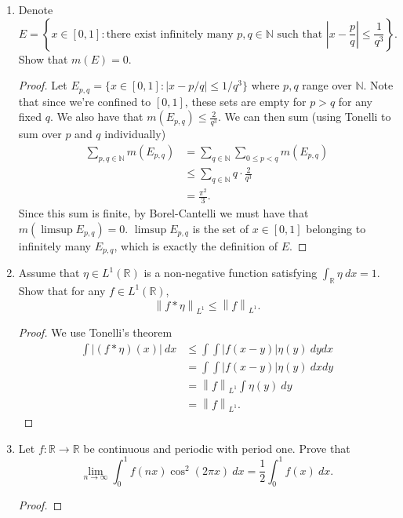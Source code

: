 \documentclass[11pt,letterpaper]{report}
\newcommand{\naturals}{\mathbb{N}}
\newcommand{\reals}{\mathbb{R}}
\newcommand{\Lp}[2]{\left\|{#1}\right\|_{L^{#2}}}
\begin{document}
\begin{enumerate}
	\item Denote
	\[
	E = \left\{x\in [0,1]: \text{there exist infinitely many $p, q\in \naturals$ such that }|x-\frac{p}{q}| \leq \frac{1}{q^3}\right\}.
	\]
	Show that $m(E) = 0$.
	\begin{proof}
		Let $E_{p,q} = \{x\in [0,1]: |x-p/q|\leq 1/q^3\}$ where $p,q$ range over $\naturals$. Note that since we're confined to $[0,1]$, these sets are empty for $p>q$ for any fixed $q$. We also have that $m(E_{p,q}) \leq \frac{2}{q^3}$. We can then sum (using Tonelli to sum over $p$ and $q$ individually)
		\begin{align*}
			\sum_{p,q\in \naturals}m(E_{p,q}) &= \sum_{q\in \naturals}\sum_{0\leq p< q}m(E_{p,q})\\
			&\leq \sum_{q\in \naturals}q\cdot \frac{2}{q^3}\\
			&= \frac{\pi^2}{3}.
		\end{align*}
		Since this sum is finite, by Borel-Cantelli we must have that $m(\limsup E_{p,q}) = 0$. $\limsup E_{p,q}$ is the set of $x\in [0,1]$ belonging to infinitely many $E_{p,q}$, which is exactly the definition of $E$.
	\end{proof}

	\item Assume that $\eta \in L^1(\reals)$ is a non-negative function satisfying $\int_\reals\eta\ dx = 1$. Show that for any $f\in L^1(\reals)$,
	\[
	\Lp{f*\eta}{1} \leq \Lp{f}{1}.
	\]
	\begin{proof}
		We use Tonelli's theorem
		\begin{align*}
			\int |(f*\eta)(x)|\ dx &\leq \int\int |f(x-y)|\eta(y)\ dydx\\
			&= \int\int |f(x-y)|\eta(y)\ dxdy\\
			&= \Lp{f}{1}\int\eta(y)\ dy\\
			&= \Lp{f}{1}.
		\end{align*}
	\end{proof}

	\item Let $f:\reals\to \reals$ be continuous and periodic with period one. Prove that
	\[
	\lim_{n\to \infty}\int_0^1f(nx)\cos^2(2\pi x)\ dx = \frac{1}{2}\int_0^1f(x)\ dx.
	\]
	\begin{proof}
		
	\end{proof}
\end{enumerate}
\end{document}
